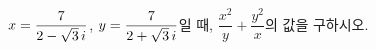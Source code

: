 $x=\dfrac{7}{2-\sqrt{3}\mkern3mu i}$, $y=\dfrac{7}{2+\sqrt{3}\mkern3mu i}$일 때, $\dfrac{x^2}{y}+\dfrac{y^2}{x}$의 값을 \mbox{구하시오.}
